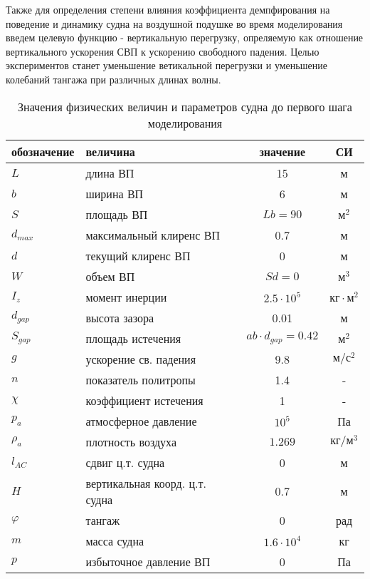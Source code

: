 Также для определения степени влияния коэффициента демпфирования на поведение и динамику судна на воздушной подушке во время моделирования введем целевую функцию - вертикальную перегрузку, опреляемую как отношение вертикального ускорения СВП к ускорению свободного падения. Целью экспериментов станет уменьшение ветикальной перегрузки и уменьшение колебаний тангажа при различных длинах волны.

\begin{table}[h]
    \caption{Значения физических величин и параметров судна до первого шага моделирования}\label{tab:total_params}
    \centering
    \begin{tabular}{@{}llcc@{}}
        \toprule
        обозначение & величина & значение & СИ\\
        \midrule
        $L$ & длина ВП & 15 & м\\
        \midrule
        $b$ & ширина ВП & 6 & м\\
        \midrule
        $S$ & площадь ВП & $Lb=90$ & $\text{м}^2$\\
        \midrule
        $d_{max}$ & максимальный клиренс ВП & 0.7 & м\\
        \midrule
        $d$ & текущий клиренс ВП & 0 & м\\
        \midrule
        $W$ & объем ВП & $Sd=0$ & $\text{м}^3$\\
        \midrule
        $I_z$ & момент инерции & $2.5\cdot 10^5$ & $\text{кг}\cdot\text{м}^2$\\
        \midrule
        $d_{gap}$ & высота зазора & 0.01 & м\\
        \midrule
        $S_{gap}$ & площадь истечения & $ab\cdot d_{gap}=0.42$ & $\text{м}^2$\\
        \midrule
        $g$ & ускорение св. падения & 9.8 & $\text{м}/\text{с}^2$\\
        \midrule
        $n$ & показатель политропы & 1.4 & -\\
        \midrule
        $\chi$ & коэффициент истечения & 1 & -\\
        \midrule
        $p_a$ & атмосферное давление & $10^5$ & Па\\
        \midrule
        $\rho_{a}$ & плотность воздуха & $1.269$ & $\text{кг}/\text{м}^3$\\
        \midrule
        $l_{AC}$ & сдвиг ц.т. судна & 0 & м\\
        \midrule
        $H$ & вертикальная коорд. ц.т. судна & 0.7 & м\\
        \midrule
        $\varphi$ & тангаж & 0 & рад \\
        \midrule
        $m$ & масса судна & $1.6\cdot 10^4$ & кг\\
        \midrule
        $p$ & избыточное давление ВП & 0 & Па\\
        \bottomrule
    \end{tabular}
    \label{tab:2}
\end{table}